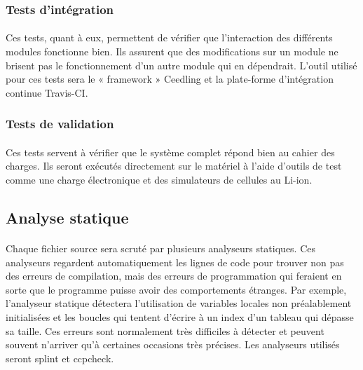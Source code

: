 		\subsubsection{Tests d'intégration}
	
			\paragraph{}
			Ces tests, quant à eux, permettent de vérifier que l’interaction des différents modules fonctionne bien. Ils assurent que des modifications sur un module ne brisent pas le fonctionnement d’un autre module qui en dépendrait. L’outil utilisé pour ces tests sera le « framework » Ceedling et la  plate-forme d’intégration continue Travis-CI.
		
		\subsubsection{Tests de validation}
	
			\paragraph{}
			Ces tests servent à vérifier que le système complet répond bien au cahier des charges. Ils seront exécutés directement sur le matériel à l’aide d’outils de test comme une charge électronique et des simulateurs de cellules au Li-ion.
	
	\subsection{Analyse statique}

		\paragraph{}
		Chaque fichier source sera scruté par plusieurs analyseurs statiques. Ces analyseurs regardent automatiquement les lignes de code pour trouver non pas des erreurs de compilation, mais des erreurs de programmation qui feraient en sorte que le programme puisse avoir des comportements étranges. Par exemple, l’analyseur statique détectera l’utilisation de variables locales non préalablement initialisées et les boucles qui tentent d’écrire à un index d’un tableau qui dépasse sa taille. Ces erreurs sont normalement très difficiles à détecter et peuvent souvent n’arriver qu’à certaines occasions très précises. Les analyseurs utilisés seront splint et ccpcheck.
	
